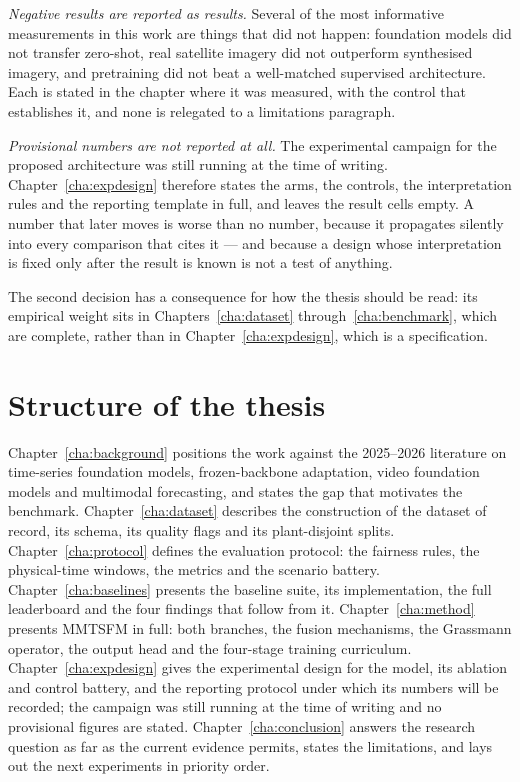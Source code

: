 \emph{Negative results are reported as results.} Several of the most informative measurements
in this work are things that did not happen: foundation models did not transfer zero-shot,
real satellite imagery did not outperform synthesised imagery, and pretraining did not beat a
well-matched supervised architecture. Each is stated in the chapter where it was measured,
with the control that establishes it, and none is relegated to a limitations paragraph.

\emph{Provisional numbers are not reported at all.} The experimental campaign for the proposed
architecture was still running at the time of writing. Chapter~\ref{cha:expdesign} therefore
states the arms, the controls, the interpretation rules and the reporting template in full,
and leaves the result cells empty. A number that later moves is worse than no number, because
it propagates silently into every comparison that cites it --- and because a design whose
interpretation is fixed only after the result is known is not a test of anything.

The second decision has a consequence for how the thesis should be read: its empirical weight
sits in Chapters~\ref{cha:dataset} through~\ref{cha:benchmark}, which are complete, rather
than in Chapter~\ref{cha:expdesign}, which is a specification.

\section{Structure of the thesis}
\label{sec:structure}

Chapter~\ref{cha:background} positions the work against the 2025--2026 literature on
time-series foundation models, frozen-backbone adaptation, video foundation models and
multimodal forecasting, and states the gap that motivates the benchmark.
Chapter~\ref{cha:dataset} describes the construction of the dataset of record, its schema,
its quality flags and its plant-disjoint splits. Chapter~\ref{cha:protocol} defines the
evaluation protocol: the fairness rules, the physical-time windows, the metrics and the
scenario battery. Chapter~\ref{cha:baselines} presents the baseline suite, its
implementation, the full leaderboard and the four findings that follow from it.
Chapter~\ref{cha:method} presents MMTSFM in full: both branches, the fusion mechanisms, the
Grassmann operator, the output head and the four-stage training curriculum.
Chapter~\ref{cha:expdesign} gives the experimental design for the model, its ablation and
control battery, and the reporting protocol under which its numbers will be recorded; the
campaign was still running at the time of writing and no provisional figures are stated.
Chapter~\ref{cha:conclusion} answers the research question as far as the current evidence
permits, states the limitations, and lays out the next experiments in priority order.

\par

